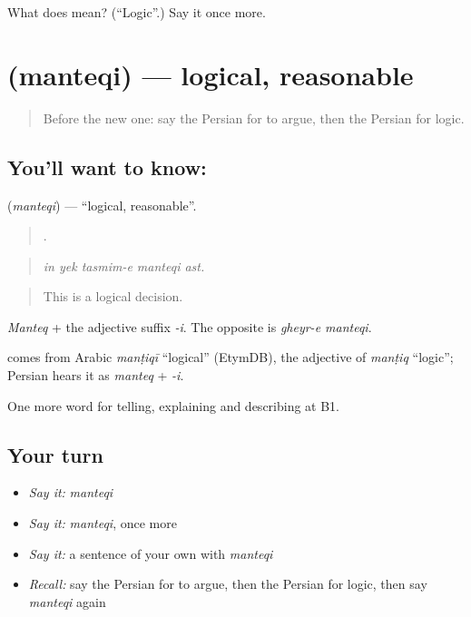 \begin{tcolorbox}[breakable,colback=teal!4,colframe=teal!35!black,title={Before you move on}]
What does  mean? (\textquotedblleft{}Logic\textquotedblright{}.) Say it once more.
\end{tcolorbox}
\section[\texorpdfstring{\fa{منطقی} (manteqi)}{منطقی (manteqi)}]{ (manteqi) — logical, reasonable}

\label{lesson:FA-C362-manteqi}



\begin{quote}
Before the new one: say the Persian for to argue, then the Persian for logic.
\end{quote}

\subsection*{You'll want to know: }
\textbf{} (\emph{manteqi}) — \textquotedblleft{}logical, reasonable\textquotedblright{}.

\begin{quote}
    .
\end{quote}

\begin{quote}
\emph{in yek tasmim-e manteqi ast.}
\end{quote}

\begin{quote}
This is a logical decision.
\end{quote}

\emph{Manteq} + the adjective suffix \emph{-i}. The opposite is \emph{gheyr-e manteqi}.

\begin{cousinweb}
\textbf{} comes from Arabic \emph{manṭiqī} \textquotedblleft{}logical\textquotedblright{} (EtymDB), the adjective of \emph{manṭiq} \textquotedblleft{}logic\textquotedblright{}; Persian hears it as \emph{manteq} + \emph{-i}.
\end{cousinweb}

\begin{grammarlens}[title={What you've built}]
One more word for telling, explaining and describing at B1.
\end{grammarlens}

\subsection*{Your turn}
\begin{itemize}
\raggedright
  \item \emph{Say it:} \emph{manteqi}
  \item \emph{Say it:} \emph{manteqi}, once more
  \item \emph{Say it:} a sentence of your own with \emph{manteqi}
  \item \emph{Recall:} say the Persian for to argue, then the Persian for logic, then say \emph{manteqi} again
\end{itemize}

